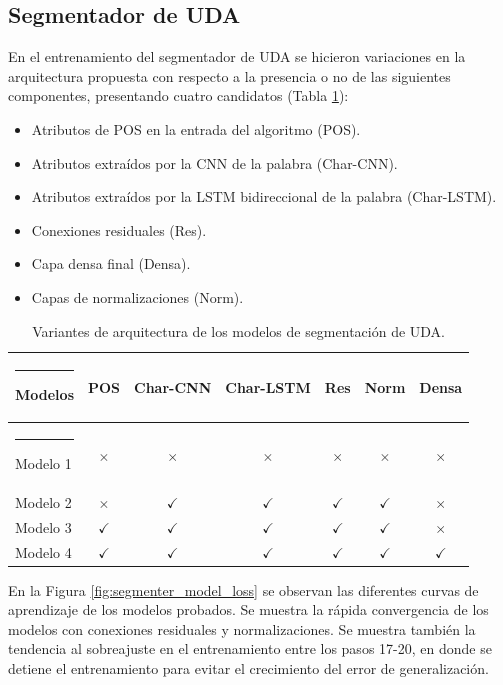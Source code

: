 \documentclass[a4paper,11pt,twocolumn,twoside]{article}
\begin{document}
\subsection{Segmentador de UDA}

En el entrenamiento del segmentador de UDA se hicieron variaciones en la arquitectura propuesta con respecto a la
presencia o no de las siguientes componentes, presentando cuatro candidatos (Tabla \ref{table:segmenter_architecture_table}):

\begin{itemize}
	\item Atributos de POS en la entrada del algoritmo (POS).
	\item Atributos extraídos por la CNN de la palabra (Char-CNN).
	\item Atributos extraídos por la LSTM bidireccional de la palabra (Char-LSTM).
	\item Conexiones residuales (Res).
	\item Capa densa final (Densa).
	\item Capas de normalizaciones (Norm).
\end{itemize}

\begin{table}[h]
	\begin{center}
		\begin{tabular}{|l|c|c|c|c|c|c|} 
			\hline\rule{-2pt}{15pt}
			Modelos  & POS          & Char-CNN     & Char-LSTM    & Res          & Norm         & Densa        \\ 
			\hline\rule{-4pt}{10pt}
			Modelo 1 & $\times$     & $\times$     & $\times$     & $\times$     & $\times$     & $\times$     \\
			Modelo 2 & $\times$     & $\checkmark$ & $\checkmark$ & $\checkmark$ & $\checkmark$ & $\times$     \\
			Modelo 3 & $\checkmark$ & $\checkmark$ & $\checkmark$ & $\checkmark$ & $\checkmark$ & $\times$     \\
			Modelo 4 & $\checkmark$ & $\checkmark$ & $\checkmark$ & $\checkmark$ & $\checkmark$ & $\checkmark$ \\ 
			\hline
		\end{tabular}
	\end{center}
	\caption{\label{table:segmenter_architecture_table}Variantes de arquitectura de los modelos de segmentación de UDA.}
\end{table}

En la Figura \ref{fig:segmenter_model_loss} se observan las diferentes curvas de aprendizaje de los modelos 
probados. Se muestra la rápida convergencia de los modelos con conexiones residuales y normalizaciones.
Se muestra también la tendencia al sobreajuste en el entrenamiento entre los pasos 17-20, en donde se detiene el 
entrenamiento para evitar el crecimiento del error de generalización.
\end{document}
